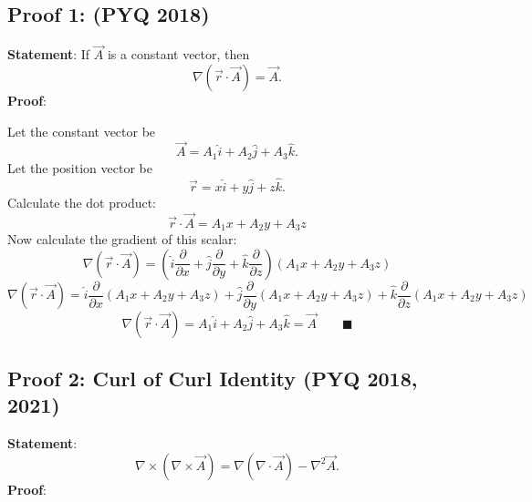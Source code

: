 \documentclass[
]{article}
\begin{document}
\subsection{Proof 1: (PYQ 2018)}\label{proof-1-pyq-2018}

\textbf{Statement}: If \(\vec{A}\) is a constant vector, then
\[
\nabla(\vec{r} \cdot \vec{A}) = \vec{A}.
\]
\textbf{Proof}:

Let the constant vector be
\[
\vec{A} = A_1\hat{i} + A_2\hat{j} + A_3\hat{k}.
\]
Let the position vector be
\[
\vec{r} = x\hat{i} + y\hat{j} + z\hat{k}.
\]
Calculate the dot product:
\[
\vec{r} \cdot \vec{A} = A_1x + A_2y + A_3z
\]
Now calculate the gradient of this scalar:
\[
\nabla(\vec{r} \cdot \vec{A}) = \left(\hat{i}\frac{\partial}{\partial x} + \hat{j}\frac{\partial}{\partial y} + \hat{k}\frac{\partial}{\partial z}\right)(A_1x + A_2y + A_3z)
\]
\[
\nabla(\vec{r} \cdot \vec{A}) = \hat{i}\frac{\partial}{\partial x}(A_1x + A_2y + A_3z) + \hat{j}\frac{\partial}{\partial y}(A_1x + A_2y + A_3z) + \hat{k}\frac{\partial}{\partial z}(A_1x + A_2y + A_3z)
\]
\[
\nabla(\vec{r} \cdot \vec{A}) = A_1\hat{i} + A_2\hat{j} + A_3\hat{k} = \vec{A} \qquad \blacksquare
\]

\subsection{Proof 2: Curl of Curl Identity (PYQ 2018,
2021)}\label{proof-2-curl-of-curl-identity-pyq-2018-2021}

\textbf{Statement}:
\[
\nabla \times (\nabla \times \vec{A}) = \nabla(\nabla \cdot \vec{A}) - \nabla^2\vec{A}.
\]
\textbf{Proof}:
\end{document}
